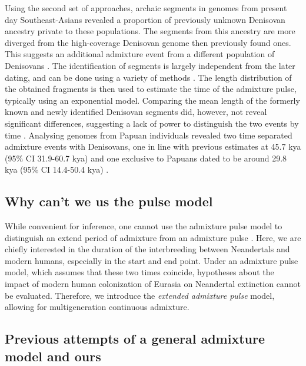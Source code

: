 \documentclass[]{article}
\begin{document}
Using the second set of approaches, archaic segments in genomes from present day Southeast-Asians revealed a proportion of previously unknown Denisovan ancestry private to these populations. The segments from this ancestry are more diverged from the high-coverage Denisovan genome then previously found ones. This suggests an additional admixture event from a different population of Denisovans \citep{browning_analysis_2018}. The identification of segments is largely independent from the later dating, and can be done using a variety of methods \citep{racimo_signatures_2017,seguin_orlando_paleogenomics_2014,vernot_excavating_2016,sankararaman_combined_2016,skov_detecting_2018}. The length distribution of the obtained fragments is then used to estimate the time of the admixture pulse, typically using an exponential model.
Comparing the mean length of the formerly known and newly identified Denisovan segments did, however, not reveal significant differences, suggesting a lack of power to distinguish the
two events by time \citep{browning_analysis_2018,jacobs_multiple_2019}. Analysing genomes from Papuan individuals revealed two time separated admixture events with Denisovans, one in line with previous estimates at 45.7 kya (95\% CI 31.9-60.7 kya) and one exclusive to Papuans dated to
be around 29.8 kya (95\% CI 14.4-50.4 kya) \citep{jacobs_multiple_2019}.


\subsection{Why can't we us the pulse model}\label{Why can't we us the pulse model}

While convenient for inference, one cannot use the admixture pulse model to distinguish an extend period of admixture from an admixture pulse \citep{pickrell_toward_2014}. Here, we are chiefly interested in the duration of the interbreeding between Neandertals and modern humans, especially in the start and end point.  Under an admixture pulse model, which assumes that these two times coincide, hypotheses about the impact of modern human colonization of Eurasia on Neandertal extinction cannot be evaluated. Therefore, we introduce the \textit{extended admixture pulse} model, allowing for multigeneration continuous admixture. 

\subsection{Previous attempts of a general admixture model and ours}\label{Previous attempts of a general admixture model and ours}
\end{document}
